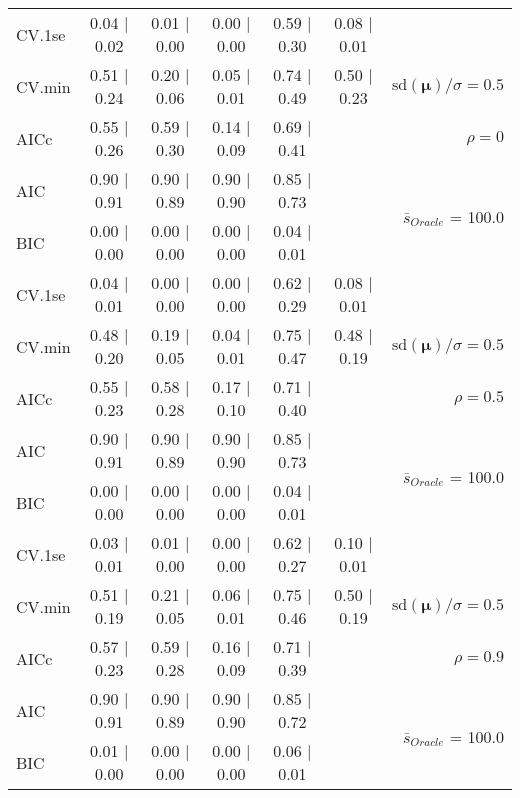 \begin{table}
\begin{center}
\begin{tabular}{l*{5}{c}|r}
 \hline 
CV.1se & 0.04 $\mid$ 0.02 & 0.01 $\mid$ 0.00 & 0.00 $\mid$ 0.00 & 0.59 $\mid$ 0.30 & 0.08 $\mid$ 0.01 & \\
CV.min & 0.51 $\mid$ 0.24 & 0.20 $\mid$ 0.06 & 0.05 $\mid$ 0.01 & 0.74 $\mid$ 0.49 & 0.50 $\mid$ 0.23 &  $\mathrm{sd}(\mathbf{\mu})/\sigma=0.5$ \\
AICc & 0.55 $\mid$ 0.26 & 0.59 $\mid$ 0.30 & 0.14 $\mid$ 0.09 & 0.69 $\mid$ 0.41 & & $\rho=0$ \\
AIC & 0.90 $\mid$ 0.91 & 0.90 $\mid$ 0.89 & 0.90 $\mid$ 0.90 & 0.85 $\mid$ 0.73 & &  \multirow{2}{*}{$\bar{s}_{Oracle}$ = 100.0} \\
BIC & 0.00 $\mid$ 0.00 & 0.00 $\mid$ 0.00 & 0.00 $\mid$ 0.00 & 0.04 $\mid$ 0.01 & &  \\
 \hline 
CV.1se & 0.04 $\mid$ 0.01 & 0.00 $\mid$ 0.00 & 0.00 $\mid$ 0.00 & 0.62 $\mid$ 0.29 & 0.08 $\mid$ 0.01 & \\
CV.min & 0.48 $\mid$ 0.20 & 0.19 $\mid$ 0.05 & 0.04 $\mid$ 0.01 & 0.75 $\mid$ 0.47 & 0.48 $\mid$ 0.19 &  $\mathrm{sd}(\mathbf{\mu})/\sigma=0.5$ \\
AICc & 0.55 $\mid$ 0.23 & 0.58 $\mid$ 0.28 & 0.17 $\mid$ 0.10 & 0.71 $\mid$ 0.40 & & $\rho=0.5$ \\
AIC & 0.90 $\mid$ 0.91 & 0.90 $\mid$ 0.89 & 0.90 $\mid$ 0.90 & 0.85 $\mid$ 0.73 & &  \multirow{2}{*}{$\bar{s}_{Oracle}$ = 100.0} \\
BIC & 0.00 $\mid$ 0.00 & 0.00 $\mid$ 0.00 & 0.00 $\mid$ 0.00 & 0.04 $\mid$ 0.01 & &  \\
 \hline 
CV.1se & 0.03 $\mid$ 0.01 & 0.01 $\mid$ 0.00 & 0.00 $\mid$ 0.00 & 0.62 $\mid$ 0.27 & 0.10 $\mid$ 0.01 & \\
CV.min & 0.51 $\mid$ 0.19 & 0.21 $\mid$ 0.05 & 0.06 $\mid$ 0.01 & 0.75 $\mid$ 0.46 & 0.50 $\mid$ 0.19 &  $\mathrm{sd}(\mathbf{\mu})/\sigma=0.5$ \\
AICc & 0.57 $\mid$ 0.23 & 0.59 $\mid$ 0.28 & 0.16 $\mid$ 0.09 & 0.71 $\mid$ 0.39 & & $\rho=0.9$ \\
AIC & 0.90 $\mid$ 0.91 & 0.90 $\mid$ 0.89 & 0.90 $\mid$ 0.90 & 0.85 $\mid$ 0.72 & &  \multirow{2}{*}{$\bar{s}_{Oracle}$ = 100.0} \\
BIC & 0.01 $\mid$ 0.00 & 0.00 $\mid$ 0.00 & 0.00 $\mid$ 0.00 & 0.06 $\mid$ 0.01 & &  \\
 \hline 
\end{tabular}
\end{center}
\vspace{-1cm}
\end{table}




